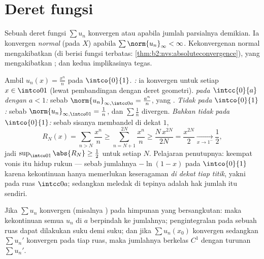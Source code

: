 \section{Deret fungsi}

\begin{definition}\label{def:b2:funcseq:series}
Sebuah deret fungsi $\sum u_n$ konvergen  atau 
apabila jumlah parsialnya demikian. Ia konvergen
\emph{normal} (pada $X$) apabila $\sum
\norm{u_n}_\infty < \infty$. Kekonvergenan normal mengakibatkan
 (di  berisi fungsi terbatas:
\cref{thm:b2:nvs:absoluteconvergence}), yang mengakibatkan ; dan kedua implikasinya tegas.
\end{definition}

\begin{example}\label{ex:b2:funcseq:threemodes}
Ambil $u_n(x) = \frac{x^n}{n}$ pada $\intco{0}{1}$. \emph{:} ia konvergen untuk setiap $x \in \intco01$ (lewat pembandingan
dengan deret geometri). \emph{ pada $\intcc{0}{a}$ dengan $a < 1$:}
sebab $\norm{u_n}_{\infty,\intcc0a} = \frac{a^n}{n}$, yang .
\emph{Tidak  pada $\intco{0}{1}$:} sebab
$\norm{u_n}_{\infty,\intco01} = \frac1n$, dan $\sum\frac1n$
divergen. \emph{Bahkan tidak  pada $\intco{0}{1}$:} sebab
sisanya membandel di dekat $1$,
\[
R_N(x) = \sum_{n>N}\frac{x^n}{n}
\geq \sum_{n=N+1}^{2N}\frac{x^n}{n}
\geq \frac{N\,x^{2N}}{2N} = \frac{x^{2N}}{2}
\xrightarrow[x\to1^-]{} \frac12 ,
\]
jadi $\sup_{\intco01}\abs{R_N} \geq \frac12$ untuk setiap $N$.
Pelajaran penutupnya: keempat vonis itu hidup rukun --- sebab
jumlahnya $-\ln(1-x)$  pada $\intco{0}{1}$ karena
kekontinuan hanya memerlukan keseragaman \emph{di dekat tiap titik},
yakni pada ruas $\intcc0a$; sedangkan meledak di tepinya adalah
hak jumlah itu sendiri.
\end{example}

\begin{theorem}\label{thm:b2:funcseq:seriestransfer}
Jika $\sum u_n$ konvergen  (misalnya ) pada himpunan yang
bersangkutan: maka kekontinuan semua $u_n$ di $a$ berpindah ke jumlahnya;
pengintegralan pada sebuah ruas dapat dilakukan suku demi suku; dan jika
$\sum u_n(x_0)$ konvergen sedangkan $\sum u_n'$ konvergen  pada
tiap ruas, maka jumlahnya berkelas $C^1$ dengan turunan $\sum u_n'$.
\end{theorem}

